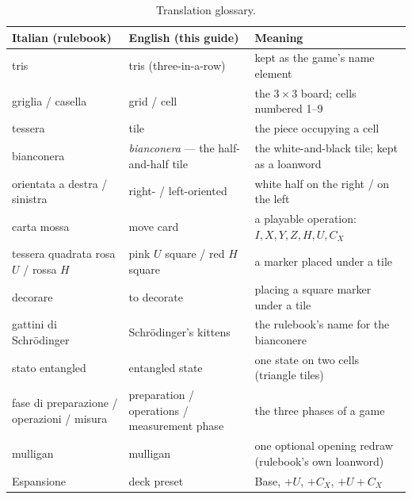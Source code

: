\documentclass[a4paper,11pt]{article}
\begin{document}
\begin{table}[H]
\centering
\footnotesize
\begin{tabular}{p{3.6cm}p{4.6cm}p{6.6cm}}
\toprule
Italian (rulebook) & English (this guide) & Meaning \\
\midrule
tris & tris (three-in-a-row) & kept as the game's name element \\
griglia / casella & grid / cell & the $3\times 3$ board; cells numbered 1--9 \\
tessera & tile & the piece occupying a cell \\
bianconera & \emph{bianconera} --- the half-and-half tile & the white-and-black tile; kept as a loanword \\
orientata a destra / sinistra & right- / left-oriented & white half on the right / on the left \\
carta mossa & move card & a playable operation: $I, X, Y, Z, H, U, C_X$ \\
tessera quadrata rosa $U$ / rossa $H$ & pink $U$ square / red $H$ square & a marker placed under a tile \\
decorare & to decorate & placing a square marker under a tile \\
gattini di Schr\"odinger & Schr\"odinger's kittens & the rulebook's name for the bianconere \\
stato entangled & entangled state & one state on two cells (triangle tiles) \\
fase di preparazione / operazioni / misura & preparation / operations / measurement phase & the three phases of a game \\
mulligan & mulligan & one optional opening redraw (rulebook's own loanword) \\
Espansione & deck preset & Base, $+U$, $+C_X$, $+U{+}C_X$ \\
\bottomrule
\end{tabular}
\caption{Translation glossary.}
\label{tab:glossary}
\end{table}
\end{document}
